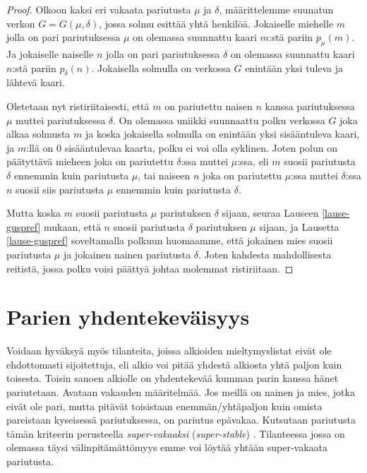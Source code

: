 \documentclass[finnish]{tktltiki2}
\theoremstyle{definition}
\theoremstyle{remark}
\begin{document}
\begin{proof}\cite[p. 27]{gusfield1989stable}
Olkoon kaksi eri vakaata pariutusta $\mu$ ja $\delta$, määrittelemme suunatun verkon $G = G(\mu, \delta)$, jossa solmu esittää yhtä henkilöä. Jokaiselle miehelle $m$ jolla on pari pariutuksessa $\mu$ on olemassa suunnattu kaari $m$:stä pariin $p_{\mu}(m)$. Ja jokaiselle naiselle $n$ jolla on pari pariutuksessa $\delta$ on olemassa suunnattu kaari $n$:stä pariin $p_{\delta}(n)$.
Jokaisella solmulla on verkossa $G$ enintään yksi tuleva ja lähtevä kaari.

Oletetaan nyt ristiriitaisesti, että $m$ on pariutettu naisen $n$ kanssa pariutuksessa $\mu$ muttei pariutuksessa $\delta$. On olemassa uniikki suunnaattu polku verkossa $G$ joka alkaa solmusta $m$ ja koska jokaisella solmulla on enintään yksi sisääntuleva kaari, ja $m$:llä on 0 sisääntulevaa kaarta, polku ei voi olla syklinen. Joten polun on päätyttävä mieheen joka on pariutettu $\delta$:ssa muttei $\mu$:ssa, eli $m$ suosii pariutusta $\delta$ ennemmin kuin pariutusta $\mu$, tai naiseen $n$ joka on pariutettu $\mu$:ssa muttei $\delta$:ssa $n$ suosii siis pariutusta $\mu$ ennemmin kuin pariutusta $\delta$.

Mutta koska $m$ suosii pariutusta $\mu$ pariutuksen $\delta$ sijaan, seuraa Lauseen \ref{lause-guspref} mukaan, että $n$ suosii pariutusta $\delta$ pariutuksen $\mu$ sijaan, ja Lausetta \ref{lause-guspref} soveltamalla polkuun huomaamme, että jokainen mies suosii pariutusta $\mu$ ja jokainen nainen pariutusta $\delta$. Joten kahdesta mahdollisesta reitistä, jossa polku voisi päättyä johtaa molemmat ristiriitaan.
\end{proof}

\section{Parien yhdentekeväisyys}
Voidaan hyväksyä myös tilanteita, joissa alkioiden mieltymyslistat eivät ole ehdottomasti sijoitettuja, eli alkio voi pitää yhdestä alkiosta yhtä paljon kuin toisesta. Toisin sanoen alkiolle on yhdentekevää kumman parin kanssa hänet pariutetaan. Avataan vakauden määritelmää. Jos meillä on nainen ja mies, jotka eivät ole pari, mutta pitävät toisistaan enemmän/yhtäpaljon kuin omista pareistaan kyseisessä pariutuksessa, on pariutus epävakaa. Kutsutaan pariutusta tämän kriteerin perusteella \emph{super-vakaaksi} (\emph{super-stable}) \cite{gusfield1989stable}. Tilanteessa jossa on olemassa täysi välinpitämättömyys emme voi löytää yhtään super-vakaata pariutusta.
\end{document}
